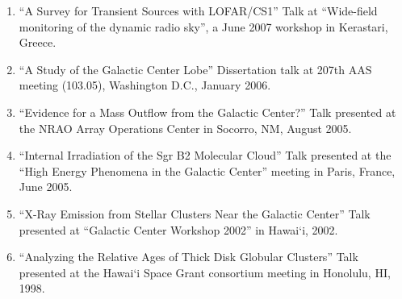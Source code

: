 \documentclass[12pt]{article}
\begin{document}
\begin{enumerate}
\item ``A Survey for Transient Sources with LOFAR/CS1''  Talk at ``Wide-field monitoring of the dynamic radio sky'', a June 2007 workshop in Kerastari, Greece.

\item ``A Study of the Galactic Center Lobe''  Dissertation talk at 207th AAS meeting (103.05), Washington D.C., January 2006.

\item ``Evidence for a Mass Outflow from the Galactic Center?''  Talk presented at the NRAO Array Operations Center in Socorro, NM, August 2005.

\item ``Internal Irradiation of the Sgr B2 Molecular Cloud''  Talk presented at the ``High Energy Phenomena in the Galactic Center'' meeting in Paris, France, June 2005.

\item ``X-Ray Emission from Stellar Clusters Near the Galactic Center''  Talk presented at ``Galactic Center Workshop 2002'' in Hawai`i, 2002.

\item ``Analyzing the Relative Ages of Thick Disk Globular Clusters''  Talk presented at the Hawai`i Space Grant consortium meeting in Honolulu, HI, 1998.
\end{enumerate}
\end{document}
